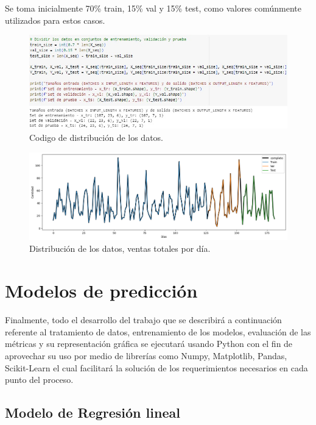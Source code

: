 Se toma inicialmente 70\% train, 15\% val y 15\% test, como valores comúnmente
utilizados para estos casos.
\begin{figure}[H]
  \begin{center}
    \includegraphics[scale=0.75]{./divisionde _datos.jpg}
    \caption{Codigo de distribución de los datos.}
    \label{fig:distribucion_algoritmo}
  \end{center}
\end{figure}

\begin{figure}[H]
  \begin{center}
    \includegraphics[scale=0.40]{./serie_normal_dividida.png}
    \caption{Distribución de los datos, ventas totales por día.}
    \label{fig:distribucion_datos}
  \end{center}
\end{figure}

\section{Modelos de predicción}
Finalmente, todo el desarrollo del trabajo que se describirá a continuación referente al tratamiento de datos, entrenamiento de los modelos, evaluación de las métricas y su representación gráfica se ejecutará usando Python con el fin de aprovechar su uso por medio
de librerías como Numpy, Matplotlib, Pandas, Scikit-Learn el cual facilitará la solución de los requerimientos necesarios en cada punto del proceso.

\subsection{Modelo de Regresión lineal}


